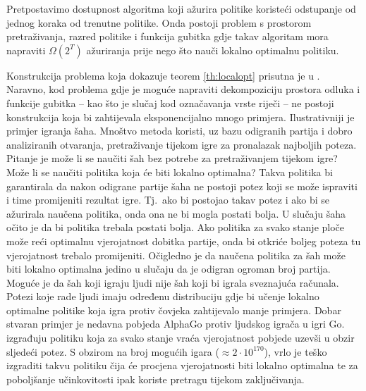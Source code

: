 \begin{theorem} \label{th:localopt}

  Pretpostavimo dostupnost algoritma koji ažurira politike koristeći odstupanje
  od jednog koraka od trenutne politike. Onda postoji problem s prostorom
  pretraživanja, razred politike i funkcija gubitka gdje takav algoritam mora
  napraviti $\Omega(2^T)$ ažuriranja prije nego što nauči lokalno optimalnu
  politiku.

\end{theorem}

Konstrukcija problema koja dokazuje teorem \ref{th:localopt} prisutna je u
\citep{daume15lols}. Naravno, kod problema gdje je moguće napraviti
dekompoziciju prostora odluka i funkcije gubitka -- kao što je slučaj kod
označavanja vrste riječi -- ne postoji konstrukcija koja bi zahtijevala
eksponencijalno mnogo primjera. Ilustrativniji je primjer igranja šaha. Mnoštvo
metoda koristi, uz bazu odigranih partija i dobro analiziranih otvaranja,
pretraživanje tijekom igre za pronalazak najboljih poteza. Pitanje je može li se
naučiti šah bez potrebe za pretraživanjem tijekom igre? Može li se naučiti
politika koja će biti lokalno optimalna? Takva politika bi garantirala da nakon
odigrane partije šaha ne postoji potez koji se može ispraviti i time promijeniti
rezultat igre. Tj.~ako bi postojao takav potez i ako bi se ažurirala naučena
politika, onda ona ne bi mogla postati bolja. U slučaju šaha očito je da bi politika
trebala postati bolja. Ako politika za svako stanje ploče može reći optimalnu
vjerojatnost dobitka partije, onda bi otkriće boljeg poteza tu vjerojatnost
trebalo promijeniti. Očigledno je da naučena politika za šah može biti lokalno
optimalna jedino u slučaju da je odigran ogroman broj partija. Moguće je da šah
koji igraju ljudi nije šah koji bi igrala sveznajuća računala. Potezi koje
rade ljudi imaju određenu distribuciju gdje bi učenje lokalno optimalne politike
koja igra protiv čovjeka zahtijevalo manje primjera. Dobar stvaran primjer je
nedavna pobjeda AlphaGo protiv ljudskog igrača u igri Go.
\citet{silver2016mastering} izgrađuju politiku koja za svako stanje vraća
vjerojatnost pobjede uzevši u obzir sljedeći potez. S obzirom na broj mogućih
igara ($\approx 2\cdot10^{170}$), vrlo je teško izgraditi takvu politiku čija će
procjena vjerojatnosti biti lokalno optimalna te za poboljšanje učinkovitosti
ipak koriste pretragu tijekom zaključivanja.

